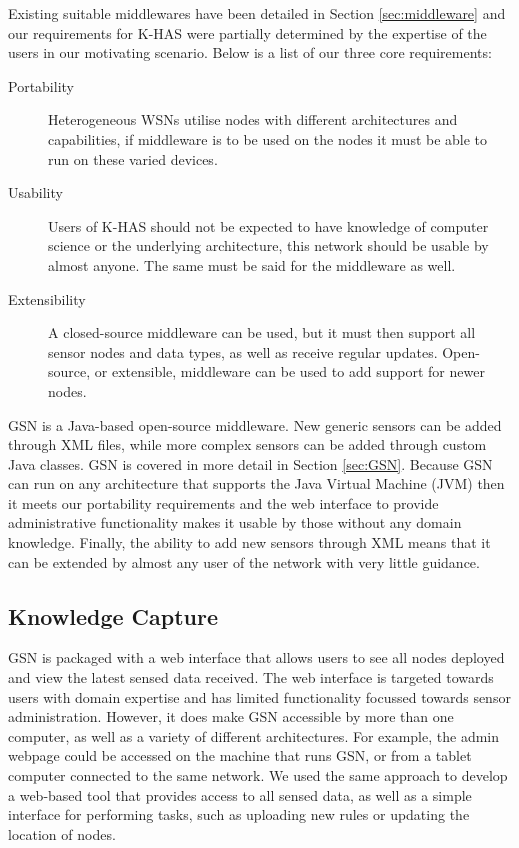 	Existing suitable middlewares have been detailed in Section \ref{sec:middleware} and our requirements for K-HAS were partially determined by the expertise of the users in our motivating scenario. Below is a list of our three core requirements:
	\begin{description}
		\item[Portability] Heterogeneous WSNs utilise nodes with different architectures and capabilities, if middleware is to be used on the nodes it must be able to run on these varied devices. 
		\item[Usability] Users of K-HAS should not be expected to have knowledge of computer science or the underlying architecture, this network should be usable by almost anyone. The same must be said for the middleware as well.
		\item[Extensibility] A closed-source middleware can be used, but it must then support all sensor nodes and data types, as well as receive regular updates. Open-source, or extensible, middleware can be used to add support for newer nodes.
	\end{description}
	
	GSN is a Java-based open-source middleware. New generic sensors can be added through XML files, while more complex sensors can be added through custom Java classes. GSN is covered in more detail in Section \ref{sec:GSN}. Because GSN can run on any architecture that supports the Java Virtual Machine (JVM) then it meets our portability requirements and the web interface to provide administrative functionality makes it usable by those without any domain knowledge. Finally, the ability to add new sensors through XML means that it can be extended by almost any user of the network with very little guidance.
		
	\subsection{Knowledge Capture}\label{arch:kc}
		GSN is packaged with a web interface that allows users to see all nodes deployed and view the latest sensed data received. The web interface is targeted towards users with domain expertise and has limited functionality focussed towards sensor administration. However, it does make GSN accessible by more than one computer, as well as a variety of different architectures. For example, the admin webpage could be accessed on the machine that runs GSN, or from a tablet computer connected to the same network. We used the same approach to develop a web-based tool that provides access to all sensed data, as well as a simple interface for performing tasks, such as uploading new rules or updating the location of nodes.
		
